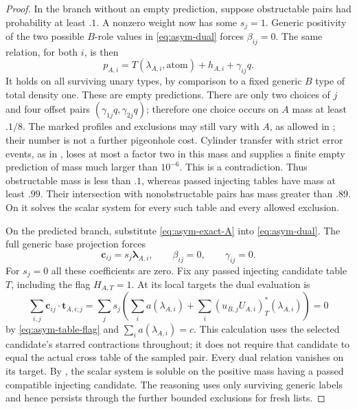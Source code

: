 \begin{proof}
In the branch without an empty prediction, suppose obstructable
pairs had probability at least \(.1\).  A nonzero weight now
has some \(s_j=1\).  Generic positivity of the two possible
\(B\)-role values in \eqref{eq:asym-dual} forces
\(\beta_{ij}=0\).  The same relation, for both \(i\), is
then
\begin{equation}
\label{eq:asym-empty-extraction}
 p_{A,i}=T(\lambda_{A,i},\mathrm{atom})
                         +h_{A,i}+\gamma_{ij}q.
\end{equation}
It holds on all surviving unary types, by comparison to a fixed
generic \(B\) type of total density one.  These are empty
predictions.  There are only two choices of \(j\) and four
offset pairs \((\gamma_{1j}q,\gamma_{2j}q)\); therefore
one choice occurs on \(A\) mass at least \(.1/8\).
The marked profiles and exclusions may still vary with \(A\),
as allowed in ; their number is not a
further pigeonhole cost.  Cylinder transfer with strict error
events, as in , loses at
most a factor two in this mass and supplies a finite empty
prediction of mass much larger than \(10^{-6}\).  This is a
contradiction.  Thus obstructable mass is less than \(.1\),
whereas passed injecting tables have mass at least \(.99\).
Their intersection with nonobstructable pairs has mass greater
than \(.89\).  On it  solves the
scalar system for every such table and every allowed exclusion.

On the predicted branch, substitute \eqref{eq:asym-exact-A}
into \eqref{eq:asym-dual}.  The full generic base projection
forces
\[
 \mathbf c_{ij}=s_j\boldsymbol\lambda_{A,i},
 \qquad \beta_{ij}=0,\qquad\gamma_{ij}=0.
\]
For \(s_j=0\) all these coefficients are zero.  Fix any
passed injecting candidate table \(T\), including the flag
\(H_{A,T}=1\).  At its local targets the dual evaluation is
\[
 \sum_{i,j}\mathbf c_{ij}\cdot\mathbf t_{A,i;j}
 =\sum_j s_j\left(
       \sum_i a(\lambda_{A,i})
       +\sum_i(u_{B,j}U_{A,i})^*_T(\lambda_{A,i})\right)=0
\]
by \eqref{eq:asym-table-flag} and
\(\sum_i a(\lambda_{A,i})=c\).  This calculation uses the
selected candidate's starred contractions throughout; it does
not require that candidate to equal the actual cross table of
the sampled pair.  Every dual relation vanishes on its target.
By , the scalar system is soluble on
the positive mass having a passed compatible injecting
candidate.  The reasoning uses only surviving generic labels
and hence persists through the further bounded exclusions for
fresh lists.


\end{proof}
